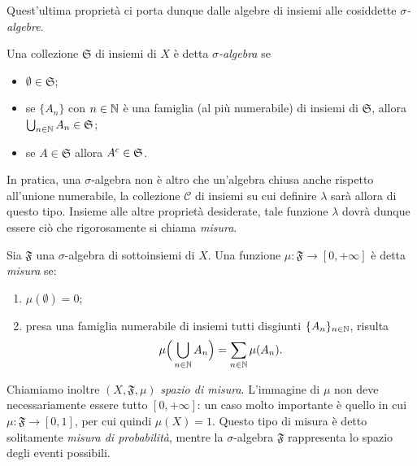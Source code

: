 Quest'ultima proprietà ci porta dunque dalle algebre di insiemi alle cosiddette \emph{$\sigma$-algebre}.
\begin{definizione} \label{d:sigma-algebra}
	Una collezione $\mathfrak S$ di insiemi di $X$ è detta \emph{$\sigma$-algebra} se
	\begin{itemize}
		\item $\emptyset\in\mathfrak S$;
		\item se $\{A_n\}$ con $n\in\mathbb{N}$ è una famiglia (al più numerabile) di insiemi di $\mathfrak S$, allora $\bigcup_{n\in\mathbb{N}}A_n\in\mathfrak S$;
		\item se $A\in\mathfrak S$ allora ${A}^c\in\mathfrak S$.
	\end{itemize}
\end{definizione}
In pratica, una $\sigma$-algebra non è altro che un'algebra chiusa anche rispetto all'unione numerabile, la collezione $\mathcal C$ di insiemi su cui definire $\lambda$ sarà allora di questo tipo. Insieme alle altre proprietà desiderate, tale funzione $\lambda$ dovrà dunque essere ciò che rigorosamente si chiama \emph{misura}.
\begin{definizione} \label{d:misura}
	Sia $\mathfrak F$ una $\sigma$-algebra di sottoinsiemi di $X$.
	Una funzione $\mu\colon\mathfrak F\to[0,+\infty]$ è detta \emph{misura} se:
	\begin{enumerate}
		\item $\mu(\emptyset)=0$;
		\item presa una famiglia numerabile di insiemi tutti disgiunti $\{A_n\}_{n\in\mathbb{N}}$, risulta
			\begin{equation}
				\mu\Big(\bigcup_{n\in\mathbb{N}}A_n\Big)=\sum_{n\in\mathbb{N}}\mu(A_n).
				\label{eq:sigma-addivita}
			\end{equation}
	\end{enumerate}
\end{definizione}
Chiamiamo inoltre $(X,\mathfrak F,\mu)$ \emph{spazio di misura}.
L'immagine di $\mu$ non deve necessariamente essere tutto $[0,+\infty]$: un caso molto importante è quello in cui $\mu\colon\mathfrak F\to[0,1]$, per cui quindi $\mu(X)=1$.
Questo tipo di misura è detto solitamente \emph{misura di probabilità}, mentre la $\sigma$-algebra $\mathfrak F$ rappresenta lo spazio degli eventi possibili.


